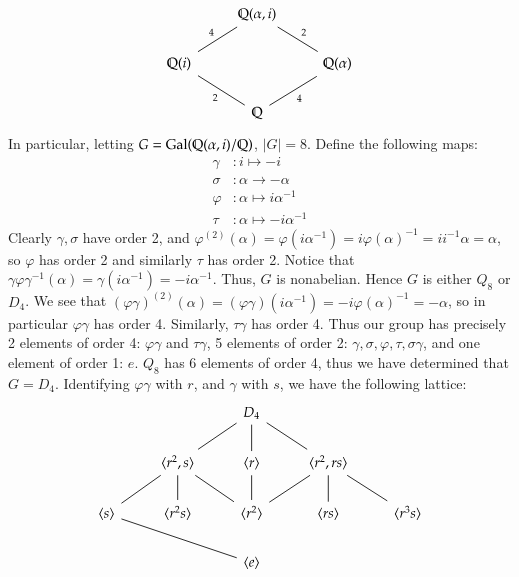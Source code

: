 \documentclass[12pt]{article}
\theoremstyle{definitionstyle}
\def\mbb#1{\mathbb{#1}}
\def \cph{\varphi}
\newcommand{\Q}{\mbb Q}
\newcommand{\Gal}{\mathrm{Gal}\qty}
\begin{document}
\begin{enumerate}[leftmargin=\labelsep]
		\[\begin{tikzcd}
			& {\Q(\alpha, i)} \\
			{\Q(i)} && {\Q(\alpha)} \\
			& \Q
			\arrow["4"', no head, from=3-2, to=2-3]
			\arrow["2"', no head, from=2-1, to=3-2]
			\arrow["4"', no head, from=1-2, to=2-1]
			\arrow["2", no head, from=1-2, to=2-3]
		\end{tikzcd}\]
		In particular, letting $G = \Gal(\Q(\alpha, i)/\Q)$, $|G| = 8$. Define the following maps:
		\begin{align*}
			\gamma&: i \mapsto -i \\
			\sigma&: \alpha \to -\alpha \\
			\cph&: \alpha \mapsto i\alpha^{-1} \\
			\tau&: \alpha \mapsto -i\alpha^{-1}
		\end{align*}
		Clearly $\gamma, \sigma$ have order 2, and $\cph^{(2)}(\alpha) = \cph(i\alpha^{-1}) = i\cph(\alpha)^{-1} = i i^{-1}\alpha = \alpha$, so $\cph$ has order 2 and similarly $\tau$ has order 2. Notice that $\gamma \cph \gamma^{-1}(\alpha) = \gamma(i\alpha^{-1}) = -i\alpha^{-1}$. Thus, $G$ is nonabelian. Hence $G$ is either $Q_8$ or $D_4$. We see that $(\cph \gamma)^{(2)}(\alpha) = (\cph \gamma)(i\alpha^{-1}) = -i\cph(\alpha)^{-1} = -\alpha$, so in particular $\cph \gamma$ has order 4. Similarly, $\tau \gamma$ has order 4. Thus our group has precisely 2 elements of order 4: $\cph \gamma$ and $\tau \gamma$, 5 elements of order 2: $\gamma, \sigma, \cph, \tau, \sigma \gamma$, and one element of order 1: $e$. $Q_8$ has 6 elements of order 4, thus we have determined that $G = D_4$. Identifying $\cph \gamma$ with $r$, and $\gamma$ with $s$, we have the following lattice:
		\[\begin{tikzcd}
			&& {D_4} \\
			& {\langle r^2,s\rangle} & {\langle r \rangle} & {\langle r^2, rs\rangle} \\
			{\langle s \rangle} & {\langle r^2s \rangle} & {\langle r^2 \rangle} & {\langle rs \rangle} & {\langle r^3s \rangle} \\
			&& {\langle e \rangle}
			\arrow[no head, from=2-2, to=3-1]
			\arrow[no head, from=2-2, to=3-2]
			\arrow[no head, from=2-2, to=3-3]
			\arrow[no head, from=3-3, to=2-3]
			\arrow[no head, from=2-2, to=1-3]
			\arrow[no head, from=2-3, to=1-3]
			\arrow[no head, from=2-4, to=1-3]
			\arrow[no head, from=2-4, to=3-3]
			\arrow[no head, from=2-4, to=3-5]
			\arrow[no head, from=3-4, to=2-4]
			\arrow[no head, from=3-1, to=4-3]

\end{tikzcd}\]
\end{enumerate}
\end{document}
